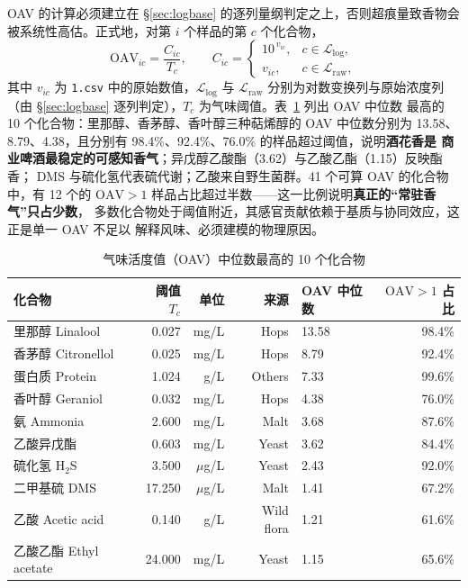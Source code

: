 OAV 的计算必须建立在 \S\ref{sec:logbase} 的逐列量纲判定之上，否则超痕量致香物会
被系统性高估。正式地，对第 $i$ 个样品的第 $c$ 个化合物，
\begin{equation}
\mathrm{OAV}_{ic}=\frac{C_{ic}}{T_c},\qquad
C_{ic}=
\begin{cases}
10^{\,v_{ic}}, & c\in\mathcal{L}_{\log},\\[2pt]
v_{ic}, & c\in\mathcal{L}_{\mathrm{raw}},
\end{cases}
\label{eq:oav}
\end{equation}
其中 $v_{ic}$ 为 \texttt{1.csv} 中的原始数值，$\mathcal{L}_{\log}$ 与
$\mathcal{L}_{\mathrm{raw}}$ 分别为对数变换列与原始浓度列（由
\S\ref{sec:logbase} 逐列判定），$T_c$ 为气味阈值。表~\ref{tab:oav} 列出 OAV 中位数
最高的 10 个化合物：里那醇、香茅醇、香叶醇三种萜烯醇的 OAV 中位数分别为 13.58、
8.79、4.38，且分别有 98.4\%、92.4\%、76.0\% 的样品超过阈值，说明\textbf{酒花香是
商业啤酒最稳定的可感知香气}；异戊醇乙酸酯（3.62）与乙酸乙酯（1.15）反映酯香；
DMS 与硫化氢代表硫代谢；乙酸来自野生菌群。41 个可算 OAV 的化合物中，有 12 个的
$\mathrm{OAV}>1$ 样品占比超过半数——这一比例说明\textbf{真正的“常驻香气”只占少数}，
多数化合物处于阈值附近，其感官贡献依赖于基质与协同效应，这正是单一 OAV 不足以
解释风味、必须建模的物理原因。

\begin{table}[H]
\centering
\caption{气味活度值（OAV）中位数最高的 10 个化合物}
\label{tab:oav}
\small
\begin{fittable}
\begin{tabular}{@{}lrrrlr@{}}
\toprule
化合物 & 阈值 $T_c$ & 单位 & 来源 & OAV 中位数 & $\mathrm{OAV}>1$ 占比 \\
\midrule
里那醇 Linalool & 0.027 & mg/L & Hops & 13.58 & 98.4\% \\
香茅醇 Citronellol & 0.025 & mg/L & Hops & 8.79 & 92.4\% \\
蛋白质 Protein & 1.024 & g/L & Others & 7.33 & 99.6\% \\
香叶醇 Geraniol & 0.032 & mg/L & Hops & 4.38 & 76.0\% \\
氨 Ammonia & 2.600 & mg/L & Malt & 3.68 & 87.6\% \\
乙酸异戊酯 & 0.603 & mg/L & Yeast & 3.62 & 84.4\% \\
硫化氢 H$_2$S & 3.500 & $\mu$g/L & Yeast & 2.43 & 92.0\% \\
二甲基硫 DMS & 17.250 & $\mu$g/L & Malt & 1.41 & 67.2\% \\
乙酸 Acetic acid & 0.140 & g/L & Wild flora & 1.21 & 61.6\% \\
乙酸乙酯 Ethyl acetate & 24.000 & mg/L & Yeast & 1.15 & 65.6\% \\
\bottomrule
\end{tabular}
\end{fittable}
\end{table}

